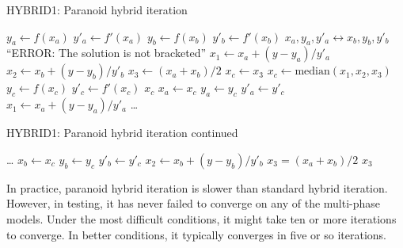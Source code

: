 \begin{algorithm}
\caption{HYBRID1: Paranoid hybrid iteration}\label{alg:hybrid1:paranoid}
\begin{algorithmic}
\State $y_a \gets f(x_a)$   
\State $y'_a \gets f'(x_a)$
\State $y_b \gets f(x_b)$
\State $y'_b \gets f'(x_b)$
    \State $x_a,y_a,y'_a \leftrightarrow x_b,y_b,y'_b$  
\EndIf
{}
    \State \Return ``ERROR: The solution is not bracketed''
\EndIf
\State $x_1 \gets x_a + (y-y_a)/y'_a$   
\State $x_2 \gets x_b + (y-y_b)/y'_b$
\State $x_3 \gets (x_a + x_b)/2$
     
    \State {}
        \State $x_c \gets x_3$ 
    \Else
        \State $x_c \gets \mathrm{median}(x_1,x_2,x_3)$ 
    \EndIf
    \State $y_c \gets f(x_c)$ 
    \State $y'_c\gets f'(x_c)$ 
     
        \State \Return $x_c$
    \EndIf
     
        \State $x_a \gets x_c$ 
        \State $y_a \gets y_c$
        \State $y'_a \gets y'_c$
        \State $x_1 \gets x_a + (y - y_a)/y'_a$ 
        \State \ldots
{}
\end{algorithmic}
\end{algorithm}

\begin{algorithm}
\caption{HYBRID1: Paranoid hybrid iteration continued}
\begin{algorithmic}
        \State \ldots
    \Else {}
        \State $x_b \gets x_c$ 
        \State $y_b \gets y_c$
        \State $y'_b \gets y'_c$
        \State $x_2 \gets x_b + (y - y_b)/y'_b$ 
    \EndIf
    \State $x_3 = (x_a + x_b)/2$    
\EndWhile
\State \Return $x_3$    
\EndProcedure
\end{algorithmic}
\end{algorithm}

In practice, paranoid hybrid iteration is slower than standard hybrid iteration.  However, in testing, it has never failed to converge on any of the multi-phase models.  Under the most difficult conditions, it might take ten or more iterations to converge.  In better conditions, it typically converges in five or so iterations.
